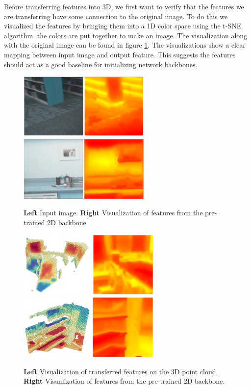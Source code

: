 \documentclass[10pt,twocolumn,letterpaper]{article}
\begin{document}
Before transferring features into 3D, we first want to verify that the features we are transferring have some connection to the original image. To do this we visualized the features by bringing them into a 1D color space using the t-SNE \cite{maaten2008Visualizing} algorithm. the colors are put together to make an image. The visualization along with the original image can be found in figure \ref{fig:features2dvis}. The visualizations show a clear mapping between input image and output feature. This suggests the features should act as a good baseline for initializing network backbones.

\begin{figure}
    \centering
    \includegraphics[width=6.5cm]{images/experiments/25.02.2022-image-pretrain-vis2.png}
    \includegraphics[width=6.5cm]{images/experiments/25.02.2022-image-pretrain-vis1.png}
    \caption{\textbf{Left} Input image. \textbf{Right} Visualization of features from the pre-trained 2D backbone}
    \label{fig:features2dvis}
\end{figure}

\begin{figure}
    \centering
    \includegraphics[width=7cm]{images/experiments/image-to-point-vis1.png}
    \includegraphics[width=7cm]{images/experiments/image-to-point-vis2.png}
    \caption{\textbf{Left} Visualization of transferred features on the 3D point cloud. \textbf{Right}  Visualization of features from the pre-trained 2D backbone.}
    \label{fig:features2d-3dvis}
\end{figure}
\end{document}
